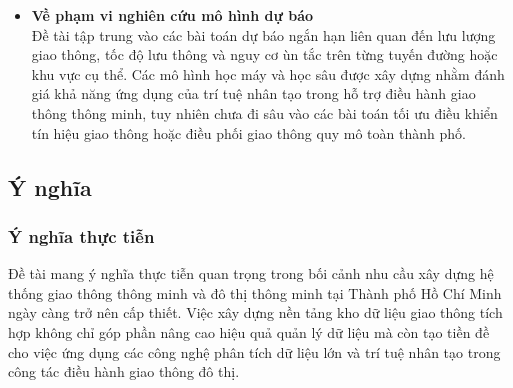 \begin{itemize}
    \item \textbf{Về phạm vi nghiên cứu mô hình dự báo}\\
    Đề tài tập trung vào các bài toán dự báo ngắn hạn liên quan đến lưu lượng giao thông, tốc độ lưu thông và nguy cơ ùn tắc trên từng tuyến đường hoặc khu vực cụ thể. Các mô hình học máy và học sâu được xây dựng nhằm đánh giá khả năng ứng dụng của trí tuệ nhân tạo trong hỗ trợ điều hành giao thông thông minh, tuy nhiên chưa đi sâu vào các bài toán tối ưu điều khiển tín hiệu giao thông hoặc điều phối giao thông quy mô toàn thành phố.

\end{itemize}

\subsection{Ý nghĩa}

\subsubsection{Ý nghĩa thực tiễn}

Đề tài mang ý nghĩa thực tiễn quan trọng trong bối cảnh nhu cầu xây dựng hệ thống giao thông thông minh và đô thị thông minh tại Thành phố Hồ Chí Minh ngày càng trở nên cấp thiết. Việc xây dựng nền tảng kho dữ liệu giao thông tích hợp không chỉ góp phần nâng cao hiệu quả quản lý dữ liệu mà còn tạo tiền đề cho việc ứng dụng các công nghệ phân tích dữ liệu lớn và trí tuệ nhân tạo trong công tác điều hành giao thông đô thị.

